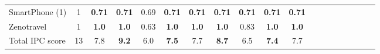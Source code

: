 \begin{tabular}{lccccccccccccccccccl}
SmartPhone (1) & 1 & \textbf{0.71} & \textbf{0.71} & 0.69 & \textbf{0.71} & \textbf{0.71} & \textbf{0.71} & \textbf{0.71} & \textbf{0.71} &\multicolumn{2}{c}{ \textbf{0.71}  } \\ 
Zenotravel & 1 & \textbf{1.0} & \textbf{1.0} & 0.63 & \textbf{1.0} & \textbf{1.0} & \textbf{1.0} & 0.83 & \textbf{1.0} &\multicolumn{2}{c}{ \textbf{1.0}  } \\ 
\midrule
Total IPC score & 13 & 7.8 & \textbf{9.2} & 6.0 & \textbf{7.5} & 7.7 & \textbf{8.7} & 6.5 & \textbf{7.4} &\multicolumn{2}{c}{ 7.7  } \\ 
\bottomrule 
 \end{tabular} 
